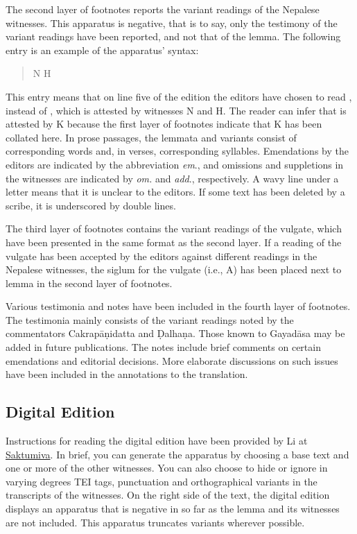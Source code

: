 The second layer of footnotes reports the variant readings of the Nepalese witnesses. This apparatus is negative, that is to say, only the testimony of the variant readings have been reported, and not that of the lemma. The following entry is an example of the apparatus' syntax:
\begin{quote}
\dev{5 pratanuṃ ]  pratanū} N H 
\end{quote}
This entry means that on line five of the edition the editors have chosen to read , instead of , which is attested by witnesses N and H. The reader can infer that  is attested by K because the first layer of footnotes indicate that K has been collated here. In prose passages, the lemmata and 
variants consist of corresponding words and, in verses, corresponding syllables. Emendations by the editors are indicated by the abbreviation \emph{em}., and omissions and suppletions in the witnesses are indicated by \emph{om.} and \emph{add}., respectively. A wavy line under a letter means that it is unclear to the editors. If some text has been deleted by a scribe, it is underscored by double lines. 

The third layer of footnotes contains the variant readings of the vulgate, which have been presented in the same format as the second layer. If a reading of the vulgate has been accepted by the editors against different readings in the Nepalese witnesses, the siglum for the vulgate (i.e., A) has been placed next to lemma in the second layer of footnotes. 

Various testimonia and notes have been included in the fourth layer of footnotes. The testimonia mainly consists of the variant readings noted by the commentators Cakrapāṇidatta and Ḍalhaṇa. Those known to Gayadāsa may be added in future publications. The notes include brief comments on certain emendations and editorial decisions. More elaborate discussions on such issues have been included in the annotations to the translation.

\subsection{Digital Edition}
Instructions for reading the digital edition have been provided by  Li at 
\href{https://saktumiva.org/wiki/users}{Saktumiva}. In brief, you can 
generate the apparatus by choosing a base text and one or more of the other 
witnesses. You can also choose to hide or ignore in varying degrees TEI 
tags, punctuation and orthographical variants in the transcripts of the witnesses. 
On the right side of the text, the digital edition displays an apparatus that is 
negative in so far as the lemma and its witnesses are not included. This apparatus 
truncates variants wherever possible. 

